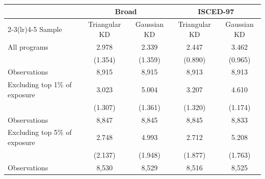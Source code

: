 \begin{tabular}{lcccc}
\toprule
 & \multicolumn{2}{c}{Broad} & \multicolumn{2}{c}{ISCED-97} \\
\cmidrule(lr){2-3}\cmidrule(lr){4-5}
Sample & Triangular KD & Gaussian KD & Triangular KD & Gaussian KD \\
\midrule
All programs &  2.978\sym{**} &  2.339\sym{*} &  2.447\sym{***} &  3.462\sym{***} \\
 & (1.354) & (1.359) & (0.890) & (0.965) \\
 \quad Observations &     8,915 &     8,915 &     8,913 &     8,913 \\
\addlinespace
Excluding top 1\% of exposure &  3.023\sym{**} &  5.004\sym{***} &  3.207\sym{**} &  4.610\sym{***} \\
 & (1.307) & (1.361) & (1.320) & (1.174) \\
 \quad Observations &     8,847 &     8,845 &     8,845 &     8,833 \\
\addlinespace
Excluding top 5\% of exposure &  2.748 &  4.993\sym{**} &  2.712 &  5.208\sym{***} \\
 & (2.137) & (1.948) & (1.877) & (1.763) \\
 \quad Observations &     8,530 &     8,529 &     8,516 &     8,525 \\
\bottomrule
\end{tabular}

